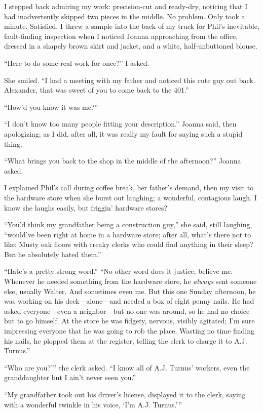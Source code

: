 I stepped back admiring my work: precision-cut and ready-dry, noticing
that I had inadvertently skipped two pieces in the middle. No problem.
Only took a minute. Satisfied, I threw a sample into the back of my
truck for Phil's inevitable, fault-finding inspection when I noticed
Joanna approaching from the office, dressed in a shapely brown skirt and
jacket, and a white, half-unbuttoned blouse.

``Here to do some real work for once?'' I asked.

She smiled. ``I had a meeting with my father and noticed this cute guy
out back. Alexander, that was sweet of you to come back to the 401.''

``How'd you know it was me?''

``I don't know too many people fitting your description.'' Joanna said,
then apologizing; as I did, after all, it was really my fault for saying
such a stupid thing.

``What brings you back to the shop in the middle of the afternoon?''
Joanna asked.

I explained Phil's call during coffee break, her father's demand, then
my visit to the hardware store when she burst out laughing; a wonderful,
contagious laugh. I know she laughs easily, but friggin' hardware
stores?

``You'd think my grandfather being a construction guy,'' she said, still
laughing, ``would've been right at home in a hardware store; after all,
what's there not to like: Musty oak floors with creaky clerks who could
find anything in their sleep? But he absolutely hated them.''

``Hate's a pretty strong word.'' ``No other word does it justice,
believe me. Whenever he needed something from the hardware store, he
\emph{always} sent someone else, usually Walter. And sometimes even me.
But this one Sunday afternoon, he was working on his deck---alone---and
needed a box of eight penny nails. He had asked everyone---even a
neighbor---but no one was around, so he had no choice but to go himself.
At the store he was fidgety, nervous, visibly agitated; I'm sure
impressing everyone that he was going to rob the place. Wasting no time
finding his nails, he plopped them at the register, telling the clerk to
charge it to A.J. Turnus.''

``Who are you?''' the clerk asked. ``I know all of A.J. Turnus' workers,
even the granddaughter but I ain't never seen you.''

``My grandfather took out his driver's license, displayed it to the
clerk, saying with a wonderful twinkle in his voice, `I'm A.J.
Turnus.'\,''

